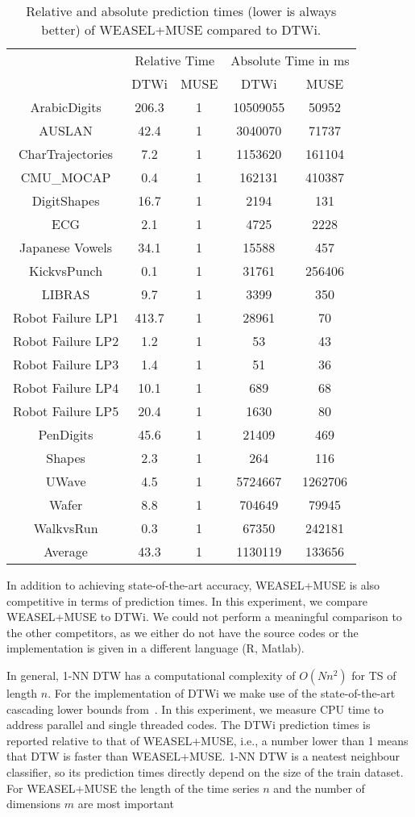 \documentclass[sigconf]{acmart}
\begin{document}
\begin{table}[t]
	\begin{centering}
		\begin{tabular*}{1\columnwidth}{@{\extracolsep{\fill}}ccccc}
			& \multicolumn{2}{c}{Relative Time} & \multicolumn{2}{c}{Absolute Time in ms}\tabularnewline			
			& DTWi & MUSE & DTWi & MUSE\tabularnewline
			\hline 
			\hline 
			ArabicDigits & 206.3 & 1 & 10509055 & 50952\tabularnewline
			\hline 
			AUSLAN & 42.4 & 1 & 3040070 & 71737\tabularnewline
			\hline 
			CharTrajectories & 7.2 & 1 & 1153620 & 161104\tabularnewline
			\hline 
			CMU\_MOCAP & 0.4 & 1 & 162131 & 410387\tabularnewline
			\hline 
			DigitShapes & 16.7 & 1 & 2194 & 131\tabularnewline
			\hline 
			ECG & 2.1 & 1 & 4725 & 2228\tabularnewline
			\hline 
			Japanese Vowels & 34.1 & 1 & 15588 & 457\tabularnewline
			\hline 
			KickvsPunch & 0.1 & 1 & 31761 & 256406\tabularnewline
			\hline 
			LIBRAS & 9.7 & 1 & 3399 & 350\tabularnewline
			\hline 
			Robot Failure LP1 & 413.7 & 1 & 28961 & 70\tabularnewline
			\hline 
			Robot Failure LP2 & 1.2 & 1 & 53 & 43\tabularnewline
			\hline 
			Robot Failure LP3 & 1.4 & 1 & 51 & 36\tabularnewline
			\hline 
			Robot Failure LP4 & 10.1 & 1 & 689 & 68\tabularnewline
			\hline 
			Robot Failure LP5 & 20.4 & 1 & 1630 & 80\tabularnewline
			\hline 
			PenDigits & 45.6 & 1 & 21409 & 469\tabularnewline
			\hline 
			Shapes & 2.3 & 1 & 264 & 116\tabularnewline
			\hline 
			UWave & 4.5 & 1 & 5724667 & 1262706\tabularnewline
			\hline 
			Wafer & 8.8 & 1 & 704649 & 79945\tabularnewline
			\hline 
			WalkvsRun & 0.3 & 1 & 67350 & 242181\tabularnewline		
			\hline 
			\hline 
			{Average} & {43.3} & {1} & {1130119} & {133656}\tabularnewline
		\end{tabular*}
		\par\end{centering}
	\caption{Relative and absolute prediction times (lower is always better) of WEASEL+MUSE compared to DTWi.}
\end{table}

In addition to achieving state-of-the-art accuracy, WEASEL+MUSE is also competitive in terms of prediction times. In this experiment, we compare WEASEL+MUSE to DTWi. We could not perform a meaningful comparison to the other competitors, as we either do not have the source codes or the implementation is given in a different language (R, Matlab).

In general, 1-NN DTW has a computational complexity of $O(N n^{2})$ for TS of length $n$. For the implementation of DTWi we make use of the state-of-the-art cascading lower bounds from~\cite{rakthanmanon2012searching}. In this experiment, we measure CPU time to address parallel and single threaded codes. 
The DTWi prediction times is reported relative to that of WEASEL+MUSE, i.e., a number lower than 1 means that DTW is faster than WEASEL+MUSE. 1-NN DTW is a neatest neighbour classifier, so its prediction times directly depend on the size of the train dataset. For WEASEL+MUSE the length of the time series $n$ and the number of dimensions $m$ are most important
\end{document}
